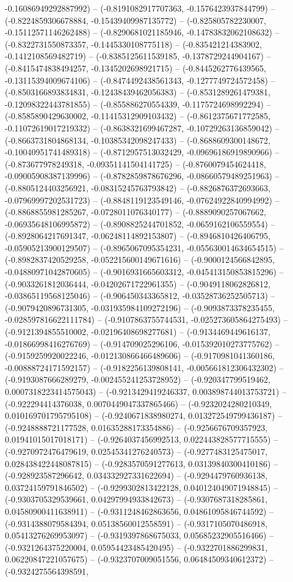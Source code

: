 -0.16086949292887992) -- (-0.8191082917707363, -0.1576423937844799) -- (-0.8224859306678884, -0.15439409987135772) -- (-0.825805782230007, -0.15112571146262488) -- (-0.8290681021185946, -0.14783832062108632) -- (-0.8322731550873357, -0.1445330108775118) -- (-0.835421214383902, -0.1412108569482719) -- (-0.8385125611539185, -0.1378729244904167) -- (-0.8415474838494257, -0.1345202698921715) -- (-0.8445262776439565, -0.13115394009674106) -- (-0.8474492438561343, -0.1277749724572458) -- (-0.8503166893834831, -0.12438439462056383) -- (-0.8531289261479381, -0.12098322443781855) -- (-0.855886270554339, -0.1175724698992294) -- (-0.8585890429630002, -0.11415312909103432) -- (-0.8612375671772585, -0.11072619017219332) -- (-0.8638321699467287, -0.10729263136859042) -- (-0.8663731804868134, -0.10385342098247433) -- (-0.8688609300148672, -0.10040951741489318) -- (-0.8712957513032429, -0.09696186919890966) -- (-0.873677978249318, -0.09351141504141725) -- (-0.8760079454624418, -0.09005908387139996) -- (-0.8782859878676296, -0.08660579489251963) -- (-0.8805124403256921, -0.08315245763793842) -- (-0.8826876372693663, -0.07969997202531723) -- (-0.8848119123549146, -0.07624922840994992) -- (-0.8868855981285267, -0.0728011076340177) -- (-0.8889090257067662, -0.06935648106995872) -- (-0.8908825244701852, -0.0659162106559554) -- (-0.8928064217691347, -0.06248114892153807) -- (-0.8946810426406795, -0.05905213900129507) -- (-0.8965067095354231, -0.055630014634654515) -- (-0.8982837420529258, -0.052215600149671616) -- (-0.9000124566842895, -0.04880971042870605) -- (-0.9016931665603312, -0.045413150853815296) -- (-0.9033261812036444, -0.04202671722961355) -- (-0.9049118062826812, -0.03865119568125046) -- (-0.906450343365812, -0.03528736252505713) -- (-0.9079420896731305, -0.031935984109272196) -- (-0.9093873378235455, -0.028597816622111784) -- (-0.9107863755744531, -0.025273605864275493) -- (-0.9121394855510002, -0.02196408698277681) -- (-0.9134469449616137, -0.01866998416276769) -- (-0.914709025296106, -0.015392010273775762) -- (-0.9159259920022246, -0.012130866466489606) -- (-0.9170981041360186, -0.00888724171592157) -- (-0.9182256139808141, -0.005661812306432302) -- (-0.9193087666289279, -0.002455241253728952) -- (-0.920347799519462, 0.0007318223414575043) -- (-0.9213429419246337, 0.003898744013753721) -- (-0.922294414376038, 0.0070449047337865466) -- (-0.9232024280210349, 0.010169701795795108) -- (-0.9240671838980274, 0.013272549799436187) -- (-0.9248888721177528, 0.01635288173354886) -- (-0.9256676709357923, 0.01941015017018171) -- (-0.9264037456992513, 0.022443828577715555) -- (-0.9270972476479619, 0.02545341276240573) -- (-0.9277483125475017, 0.028438422448087815) -- (-0.9283570591277613, 0.03139840300410186) -- (-0.928923587296642, 0.034332927331622694) -- (-0.9294479760936138, 0.03724159791846502) -- (-0.9299302813422128, 0.040124049071948845) -- (-0.9303705329539661, 0.04297994933842673) -- (-0.9307687318285861, 0.04580900411638911) -- (-0.9311248462863656, 0.04861095846744592) -- (-0.9314388079584394, 0.05138560012558591) -- (-0.9317105070486918, 0.05413276269953097) -- (-0.9319397868675033, 0.05685232905516466) -- (-0.9321264375220004, 0.05954423485420495) -- (-0.9322701886299831, 0.06220847221057675) -- (-0.9323707009051556, 0.06484509340612372) -- (-0.9324275564398591, 
